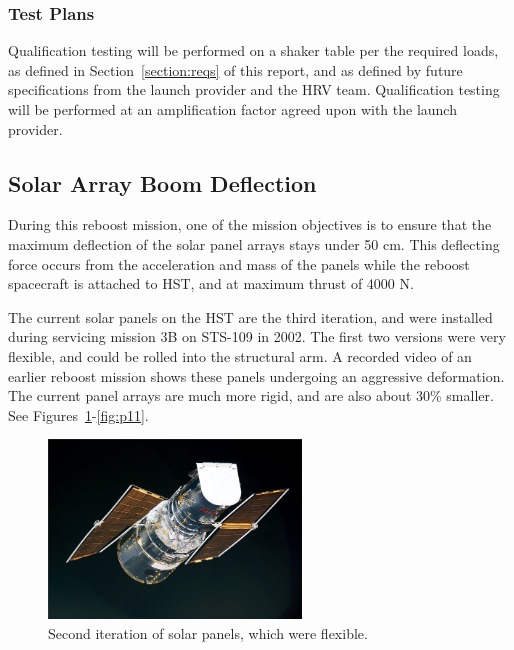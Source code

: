 \documentclass[paper=letter, fontsize=11pt]{scrartcl} %
\numberwithin{equation}{section} %
\numberwithin{figure}{section} %
\numberwithin{table}{section} %
\begin{document}
\subsubsection{Test Plans}
Qualification testing will be performed on a shaker table per the required loads, as defined in Section~\ref{section:reqs} of this report, and as defined by future specifications from the launch provider and the HRV team. Qualification testing will be performed at an amplification factor agreed upon with the launch provider.

\subsection{Solar Array Boom Deflection}

During this reboost mission, one of the mission objectives is to ensure that the maximum deflection of the solar panel arrays stays under 50 cm. This deflecting force occurs from the acceleration and mass of the panels while the reboost spacecraft is attached to HST, and at maximum thrust of 4000 N.

The current solar panels on the HST are the third iteration, and were installed during servicing mission 3B on STS-109 in 2002. The first two versions were very flexible, and could be rolled into the structural arm. A recorded video of an earlier reboost mission shows these panels undergoing an aggressive deformation. The current panel arrays are much more rigid, and are also about 30\% smaller. See Figures~\ref{fig:p9}-\ref{fig:p11}.

\begin{figure}[H]
    \begin{center}
    \includegraphics[width=0.6\textwidth]{Pics/9.png}
    \caption{Second iteration of solar panels, which were flexible.}
    \label{fig:p9}
    \end{center}
\end{figure}
\end{document}
